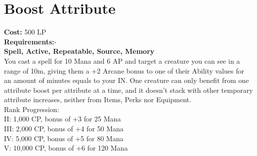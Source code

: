 \section{Boost Attribute}\label{spell:boostAttribute}
\textbf{Cost:} 500 LP\\
\textbf{Requirements:}-\\
\textbf{Spell, Active, Repeatable, Source, Memory}\\
You cast a spell for 10 Mana and 6 AP and target a creature you can see in a range of 10m, giving them a +2 Arcane bonus to one of their Ability values for an amount of minutes equals to your IN.
One creature can only benefit from one attribute boost per attribute at a time, and it doesn't stack with other temporary attribute increases, neither from Items, Perks nor Equipment.
\\
Rank Progression:\\
II: 1,000 CP, bonus of +3 for 25 Mana\\
III: 2,000 CP, bonus of +4 for 50 Mana\\
IV: 5,000 CP, bonus of +5 for 80 Mana\\
V: 10,000 CP, bonus of +6 for 120 Mana\\